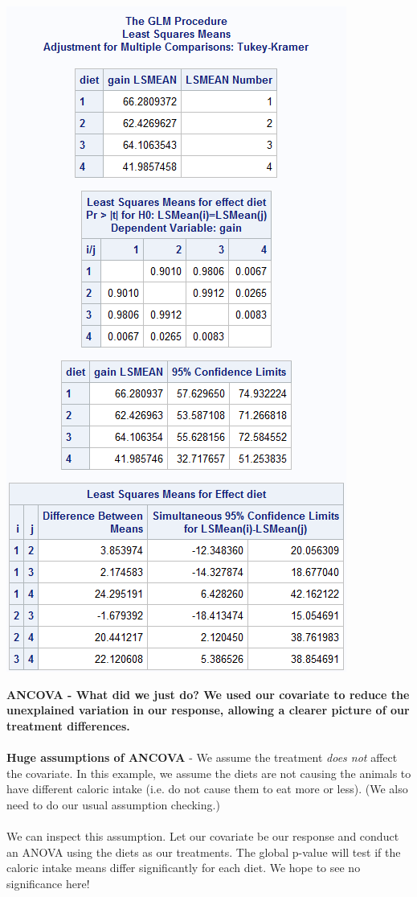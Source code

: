 \begin{flushleft}
\includegraphics[scale=0.8]{DietsTukey}
\end{flushleft}

\newpage

\textbf{ANCOVA - What did we just do?  We used our covariate to reduce the unexplained variation in our response, allowing a clearer picture of our treatment differences. } \\~\\

\textbf{Huge assumptions of ANCOVA} - We assume the treatment \textit{does not} affect the covariate.  In this example, we assume the diets are not causing the animals to have different caloric intake (i.e. do not cause them to eat more or less). (We also need to do our usual assumption checking.)\\~\\
 We can inspect this assumption.  Let our covariate be our response and conduct an ANOVA using the diets as our treatments.  The global p-value will test if the caloric intake means differ significantly for each diet.  We hope to see no significance here!

